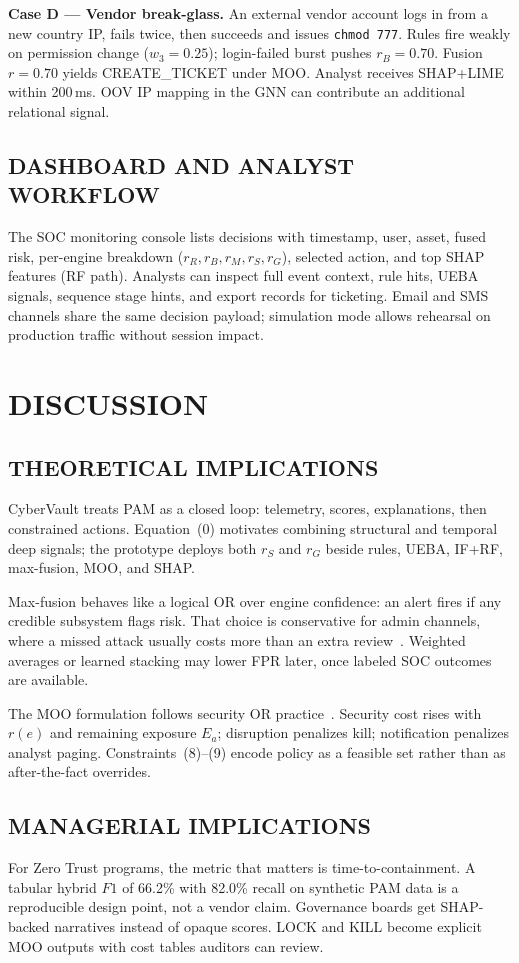 \documentclass{ieeeaccess}
\begin{document}
\textbf{Case D --- Vendor break-glass.} An external vendor account logs in from a new country IP, fails twice, then succeeds and issues \texttt{chmod 777}. Rules fire weakly on permission change ($w_3=0.25$); login-failed burst pushes $r_B=0.70$. Fusion $r=0.70$ yields CREATE\_TICKET under MOO. Analyst receives SHAP+LIME within 200\,ms. OOV IP mapping in the GNN can contribute an additional relational signal.

\subsection{DASHBOARD AND ANALYST WORKFLOW}
The SOC monitoring console lists decisions with timestamp, user, asset, fused risk, per-engine breakdown ($r_R,r_B,r_M,r_S,r_G$), selected action, and top SHAP features (RF path). Analysts can inspect full event context, rule hits, UEBA signals, sequence stage hints, and export records for ticketing. Email and SMS channels share the same decision payload; simulation mode allows rehearsal on production traffic without session impact.

\section{DISCUSSION}
\label{sec:discussion}

\subsection{THEORETICAL IMPLICATIONS}
CyberVault treats PAM as a closed loop: telemetry, scores, explanations, then constrained actions. Equation~(0) motivates combining structural and temporal deep signals; the prototype deploys both $r_S$ and $r_G$ beside rules, UEBA, IF+RF, max-fusion, MOO, and SHAP.

Max-fusion behaves like a logical OR over engine confidence: an alert fires if any credible subsystem flags risk. That choice is conservative for admin channels, where a missed attack usually costs more than an extra review~\cite{ref6}. Weighted averages or learned stacking may lower FPR later, once labeled SOC outcomes are available.

The MOO formulation follows security OR practice~\cite{ref14,ref15}. Security cost rises with $r(e)$ and remaining exposure $E_a$; disruption penalizes kill; notification penalizes analyst paging. Constraints~(8)--(9) encode policy as a feasible set rather than as after-the-fact overrides.

\subsection{MANAGERIAL IMPLICATIONS}
For Zero Trust programs, the metric that matters is time-to-containment. A tabular hybrid $F1$ of 66.2\% with 82.0\% recall on synthetic PAM data is a reproducible design point, not a vendor claim. Governance boards get SHAP-backed narratives instead of opaque scores. LOCK and KILL become explicit MOO outputs with cost tables auditors can review.
\end{document}
